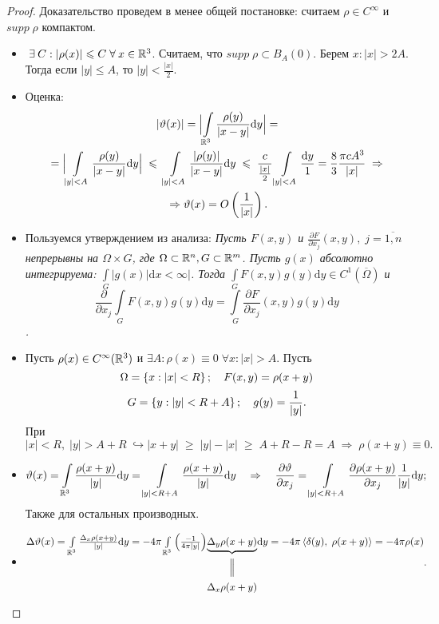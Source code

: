 \begin{proof}

Доказательство проведем в менее общей постановке: считаем $\rho \in C^\infty$ и $supp \;\rho$ компактом.

	\begin{itemize}
		\item $\exists C: |\rho (x)|\leq C \forall  x \in \R^3$. Считаем, что $supp \;\rho  \subset B_A(0)$. Берем $x: |x| > 2A$. Тогда если $|y| \leq A$, то $|y| < \frac{|x|}{2}$.
        \item Оценка:
        	\begin{multline*}
				\ |\vartheta (x)| = \Bigl | \int\limits_{\mathbb{R}^3} \frac{\rho (y)}{|x-y|}\mathrm{d}y \Bigr | = {}\\
                {} = \Bigl | \int\limits_{|y|<A} \frac{\rho (y)}{|x-y|}\mathrm{d}y \Bigr | \;\leqslant\; \int\limits_{|y|<A} \frac{|\rho (y)|}{|x-y|}\mathrm{d}y \;\leqslant\; \frac{c}{\frac{|x|}{2}}\int\limits_{|y|<A}\frac{\mathrm{d}y}{1} = \frac{8}{3}\frac{\pi c A^3}{|x|} \;\Rightarrow {}\\
                {} \Rightarrow \vartheta (x) = O \left(\frac{1}{|x|}\right).
			\end{multline*}
        \item Пользуемся утверждением из анализа: {\it Пусть $F(x,y)$ и $\frac{\partial F}{\partial x_j}(x,y), \; j= \overline{1,n}$ непрерывны на $\Omega \times G$, где $\Omega \subset  \mathbb{R}^n, G \subset \mathbb{R}^m$. Пусть $g(x)$ абсолютно интегрируема: $\int\limits_G |g(x)| \mathrm{d}x < \infty|$. Тогда $\int\limits_G F(x,y)g(y) \mathrm{d}y \in C^1(\overline{\Omega})$ и
        $$
        \frac{\partial}{\partial x_j}\int\limits_G F(x,y)g(y)\mathrm{d}y = \int\limits_G \frac{\partial F}{\partial x_j}(x,y)g(y)\mathrm{d}y 
        $$.}
        \item Пусть $\rho (x) \in C^\infty (\mathbb{R}^3)$ и $\exists A: \rho (x) \equiv 0 \; \forall x: |x| > A$. Пусть 
        $$\Omega = \left\{x: |x| < R\right\};\quad F(x,y) = \rho (x+y)$$
        $$G = \left\{y: |y| < R+A\right\};\quad g(y) = \frac{1}{|y|}.$$
        При $|x| < R,\; |y| > A+R \; \hookrightarrow |x+y| \;\geq\; |y| - |x| \;\geq\; A+R -R = A \;\Rightarrow \; \rho (x+y) \equiv 0. $
        \item 
        $$
        \vartheta (x) = \int\limits_{\mathbb{R}^3}\frac{\rho (x+y)}{|y|}\mathrm{d} y = \int\limits_{|y| < R+A}\frac{\rho (x+y)}{|y|}\mathrm{d} y \quad \Rightarrow\quad \frac{\partial \vartheta}{\partial x_j} = \int\limits_{|y| < R+A}\frac{\partial \rho (x+y)}{\partial x_j}\frac{1}{|y|}\mathrm{d} y
        ;$$ Также для остальных производных.
        \item 
        $$
        \begin{CD}
          \Delta \vartheta (x) = \int\limits_{\R^3}\frac{\Delta_x \rho (x+y)}{|y|}\mathrm{d}y = -4\pi \int\limits_{\R^3}\brs{\frac{-1}{4\pi |y|}} @. \underbrace{\Delta_y \rho (x+y)} @.\mathrm{d}y = -4\pi \rbrs{\delta(y),\; \rho (x+y)} = -4\pi \rho (x) \\
          @.   @|   @.\\
          @.   {\Delta_x \rho (x+y)}   @.
        \end{CD}
        .$$
	\end{itemize}

\end{proof}